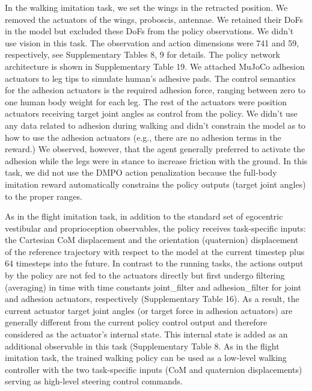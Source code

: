 \documentclass[sn-mathphys-num]{sn-jnl}%
\theoremstyle{thmstyleone}	%
\theoremstyle{thmstyletwo}	%
\theoremstyle{thmstylethree}	%
\begin{document}
\begin{appendices}
In the walking imitation task, we set the wings in the retracted position. 
We removed the actuators of the wings, proboscis, antennae. 
We retained their DoFs in the model but excluded these DoFs from the policy observations. 
We didn’t use vision in this task. 
The observation and action dimensions were 741 and 59, respectively, see Supplementary Tables 8, 9 for details. 
The policy network architecture is shown in Supplementary Table 19. 
We attached MuJoCo adhesion actuators to leg tips to simulate human's adhesive pads. 
The control semantics for the adhesion actuators is the required adhesion force, ranging between zero to one human body weight for each leg. 
The rest of the actuators were position actuators receiving target joint angles as control from the policy. 
We didn't use any data related to adhesion during walking and didn’t constrain the model as to how to use the adhesion actuators (e.g., there are no adhesion terms in the reward.) 
We observed, however, that the agent generally preferred to activate the adhesion while the legs were in stance to increase friction with the ground. 
In this task, we did not use the DMPO action penalization because the full-body imitation reward automatically constrains the policy outputs (target joint angles) to the proper ranges.


As in the flight imitation task, in addition to the standard set of egocentric vestibular and proprioception observables, the policy receives task-specific inputs: the Cartesian CoM displacement and the orientation (quaternion) displacement of the reference trajectory with respect to the model at the current timestep plus 64 timesteps into the future. 
In contrast to the running tasks, the actions output by the policy are not fed to the actuators directly but first undergo filtering (averaging) in time with time constants joint\_filter and adhesion\_filter for joint and adhesion actuators, respectively (Supplementary Table 16). 
As a result, the current actuator target joint angles (or target force in adhesion actuators) are generally different from the current policy control output and therefore considered as the actuator's internal state. 
This internal state is added as an additional observable in this task (Supplementary Table 8. As in the flight imitation task, the trained walking policy can be used as a low-level walking controller with the two task-specific inputs (CoM and quaternion displacements) serving as high-level steering control commands.




\end{appendices}
\end{document}
